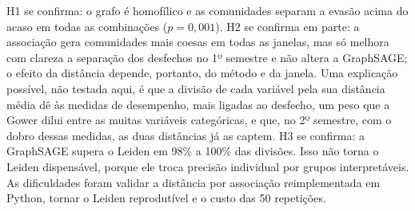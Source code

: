 H1 se confirma: o grafo é homofílico e as comunidades separam a evasão acima do acaso em todas as combinações ($p = 0{,}001$). H2 se confirma em parte: a associação gera comunidades mais coesas em todas as janelas, mas só melhora com clareza a separação dos desfechos no 1º semestre e não altera a GraphSAGE; o efeito da distância depende, portanto, do método e da janela. Uma explicação possível, não testada aqui, é que a divisão de cada variável pela sua distância média dê às medidas de desempenho, mais ligadas ao desfecho, um peso que a Gower dilui entre as muitas variáveis categóricas, e que, no 2º semestre, com o dobro dessas medidas, as duas distâncias já as captem. H3 se confirma: a GraphSAGE supera o Leiden em 98\% a 100\% das divisões. Isso não torna o Leiden dispensável, porque ele troca precisão individual por grupos interpretáveis. As dificuldades foram validar a distância por associação reimplementada em Python, tornar o Leiden reprodutível e o custo das 50 repetições.
